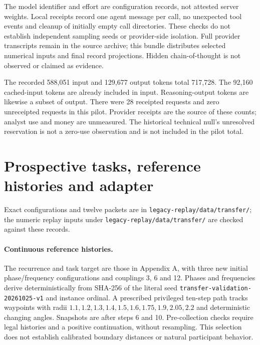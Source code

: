 The model identifier and effort are configuration records, not attested server weights. Local receipts record one agent message per call, no unexpected tool events and cleanup of initially empty call directories. These checks do not establish independent sampling seeds or provider-side isolation. Full provider transcripts remain in the source archive; this bundle distributes selected numerical inputs and final record projections. Hidden chain-of-thought is not observed or claimed as evidence.

The recorded 588,051 input and 129,677 output tokens total 717,728. The 92,160 cached-input tokens are already included in input. Reasoning-output tokens are likewise a subset of output. There were 28 receipted requests and zero unreceipted requests in this pilot. Provider receipts are the source of these counts; analyst use and money are unmeasured. The historical technical null's unresolved reservation is not a zero-use observation and is not included in the pilot total.

\section{Prospective tasks, reference histories and adapter}
\label{app:transfer}
Exact configurations and twelve packets are in
\texttt{legacy-replay/data/transfer/}; the numeric replay inputs under
\texttt{legacy-replay/data/transfer/} are checked against these records.

\paragraph{Continuous reference histories.}
The recurrence and task target are those in Appendix A, with three new
initial phase/frequency configurations and couplings 3, 6 and 12.
Phases and frequencies derive deterministically from SHA-256 of the
literal seed \texttt{transfer-validation-20261025-v1} and instance
ordinal. A prescribed privileged ten-step path tracks waypoints with
radii $1.1,1.2,1.3,1.4,1.5,1.6,1.75,1.9,2.05,2.2$ and deterministic
changing angles. Snapshots are after steps 6 and 10. Pre-collection
checks require legal histories and a positive continuation, without
resampling. This selection does not establish calibrated boundary
distances or natural participant behavior.

